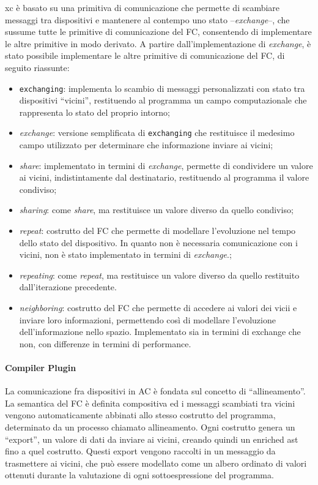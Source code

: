 \documentclass[13pt, a4paper]{article}
\begin{document}
\ac{xc} è basato su una primitiva di comunicazione che permette di scambiare messaggi tra dispositivi e mantenere al contempo uno stato --\emph{exchange}--,
che sussume tutte le primitive di comunicazione del \ac{FC},
consentendo di implementare le altre primitive in modo derivato.
%
A partire dall'implementazione di \emph{exchange}, è stato possibile implementare le altre primitive di comunicazione del \ac{FC},
di seguito riassunte:
\begin{itemize}
    \item \texttt{exchanging}: implementa lo scambio di messaggi personalizzati con stato tra dispositivi ``vicini'',
    restituendo al programma un campo computazionale che rappresenta lo stato del proprio intorno;
    \item \emph{exchange}: versione semplificata di \texttt{exchanging} che restituisce il medesimo campo utilizzato
    per determinare che informazione inviare ai vicini;
    \item \emph{share}: implementato in termini di \emph{exchange}, permette di condividere un valore ai vicini, indistintamente
    dal destinatario, restituendo al programma il valore condiviso;
    \item \emph{sharing}: come \emph{share}, ma restituisce un valore diverso da quello condiviso;
    \item \emph{repeat}: costrutto del \ac{FC} che permette di modellare l'evoluzione nel tempo dello stato del dispositivo.
        In quanto non è necessaria comunicazione con i vicini, non è stato implementato in termini di \emph{exchange}.;
    \item \emph{repeating}: come \emph{repeat}, ma restituisce un valore diverso da quello restituito dall'iterazione precedente.
    \item \emph{neighboring}: costrutto del \ac{FC} che permette di accedere ai valori dei vicii e inviare loro informazioni,
        permettendo così di modellare l'evoluzione dell'informazione nello spazio.
        Implementato sia in termini di exchange che non, con differenze in termini di performance.
\end{itemize}

\paragraph{Compiler Plugin}

La comunicazione fra dispositivi in \ac{AC} è fondata sul concetto di ``allineamento''.
%
La semantica del \ac{FC} è definita compositiva ed i messaggi scambiati tra vicini vengono automaticamente abbinati
    allo stesso costrutto del programma, determinato da un processo chiamato allineamento.
%
Ogni costrutto genera un ``export'', un valore di dati da inviare ai vicini, creando quindi un enriched \ac{ast} fino a quel costrutto.
%
Questi export vengono raccolti in un messaggio da trasmettere ai vicini, che può essere modellato come
    un albero ordinato di valori ottenuti durante la valutazione di ogni sottoespressione del programma.
\end{document}
